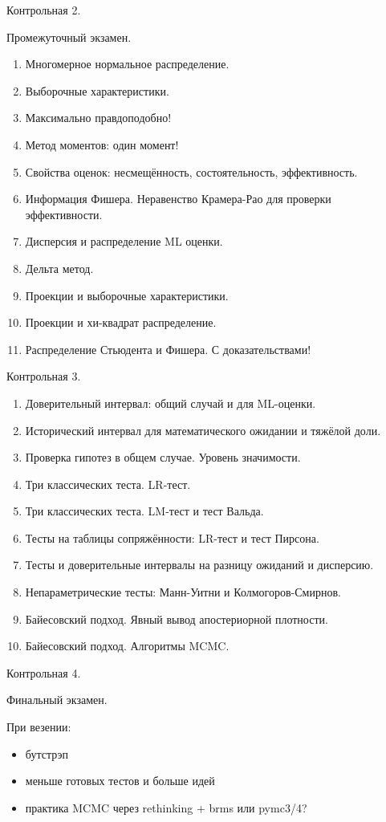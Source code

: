 \documentclass[12pt]{article}
\begin{document}
Контрольная 2.

Промежуточный экзамен.

\begin{enumerate}[resume]
  \item Многомерное нормальное распределение.
  \item Выборочные характеристики.
  \item Максимально правдоподобно!
  \item Метод моментов: один момент!
  \item Свойства оценок: несмещённость, состоятельность, эффективность.
  \item Информация Фишера. Неравенство Крамера-Рао для проверки эффективности.
  \item Дисперсия и распределение ML оценки.
  \item Дельта метод.
  \item Проекции и выборочные характеристики.
  \item Проекции и хи-квадрат распределение.
  \item Распределение Стьюдента и Фишера. С доказательствами!
\end{enumerate}

Контрольная 3.

\begin{enumerate}[resume]
  \item Доверительный интервал: общий случай и для ML-оценки.
  \item Исторический интервал для математического ожидании и тяжёлой доли.
  \item Проверка гипотез в общем случае. Уровень значимости.
  \item Три классических теста. LR-тест.
  \item Три классических теста. LM-тест и тест Вальда.
  \item Тесты на таблицы сопряжённости: LR-тест и тест Пирсона.
  \item Тесты и доверительные интервалы на разницу ожиданий и дисперсию.
  \item Непараметрические тесты: Манн-Уитни и Колмогоров-Смирнов.
  \item Байесовский подход. Явный вывод апостериорной плотности.
  \item Байесовский подход. Алгоритмы MCMC.
\end{enumerate}

Контрольная 4.

Финальный экзамен.

При везении:

\begin{itemize}
  \item бутстрэп
  \item меньше готовых тестов и больше идей
  \item практика MCMC через rethinking + brms или pymc3/4?
\end{itemize}
\end{document}
